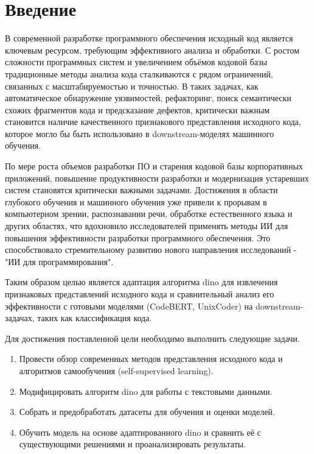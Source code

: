 \documentclass[../document.tex]{subfiles}
\begin{document}
    \section*{Введение}
    \par В современной разработке программного обеспечения исходный код является ключевым ресурсом, требующим эффективного анализа и обработки. С ростом сложности программных систем и увеличением объёмов кодовой базы традиционные методы анализа кода сталкиваются с рядом ограничений, связанных с масштабируемостью и точностью. В таких задачах, как автоматическое обнаружение уязвимостей, рефакторинг, поиск семантически схожих фрагментов кода и предсказание дефектов, критически важным становится наличие качественного признакового представления исходного кода, которое могло бы быть использовано в downstream-моделях машинного обучения.
    \par По мере роста объемов разработки ПО и старения кодовой базы корпоративных приложений, повышение продуктивности разработки и модернизация устаревших систем становятся критически важными задачами. Достижения в области глубокого обучения и машинного обучения уже привели к прорывам в компьютерном зрении, распознавании речи, обработке естественного языка и других областях, что вдохновило исследователей применять методы ИИ для повышения эффективности разработки программного обеспечения. Это способствовало стремительному развитию нового направления исследований - "ИИ для программирования". 
    \par Таким образом целью является адаптация алгоритма \gls{dino}\cite{caron2021emergingpropertiesselfsupervisedvision, oquab2024dinov2learningrobustvisual, darcet2024visiontransformersneedregisters} для извлечения признаковых представлений исходного кода и сравнительный анализ его эффективности с готовыми моделями (CodeBERT\cite{feng2020codebertpretrainedmodelprogramming}, UnixCoder\cite{guo2022unixcoder}) на downstream-задачах, таких как классификация кода.
    \par Для достижения поставленной цели необходимо выполнить следующие задачи.
    \begin{enumerate}
        \item Провести обзор современных методов представления исходного кода и алгоритмов самообучения (self-supervised learning).
        \item Модифицировать алгоритм \gls{dino} для работы с текстовыми данными.
        \item Собрать и предобработать датасеты для обучения и оценки моделей.
        \item Обучить модель на основе адаптированного \gls{dino} и сравнить её с существующими решениями и проанализировать результаты.
    \end{enumerate}
\end{document}
